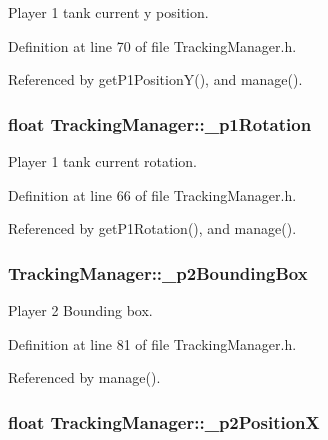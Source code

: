 Player 1 tank current y position. 



Definition at line 70 of file Tracking\-Manager.\-h.



Referenced by get\-P1\-Position\-Y(), and manage().

\hypertarget{classTrackingManager_a8c7de22662c27124fac80902d4f8ba41}{
\subsubsection[{\-\_\-p1\-Rotation}]{\setlength{\rightskip}{0pt plus 5cm}float Tracking\-Manager\-::\-\_\-p1\-Rotation\hspace{0.3cm}{\ttfamily [private]}}}\label{classTrackingManager_a8c7de22662c27124fac80902d4f8ba41}


Player 1 tank current rotation. 



Definition at line 66 of file Tracking\-Manager.\-h.



Referenced by get\-P1\-Rotation(), and manage().

\hypertarget{classTrackingManager_a345399f12e52bc4b23786fe73b26a6ff}{
\subsubsection[{\-\_\-p2\-Bounding\-Box}]{ Tracking\-Manager\-::\-\_\-p2\-Bounding\-Box\hspace{0.3cm}{\ttfamily [private]}}}\label{classTrackingManager_a345399f12e52bc4b23786fe73b26a6ff}


Player 2 Bounding box. 



Definition at line 81 of file Tracking\-Manager.\-h.



Referenced by manage().

\hypertarget{classTrackingManager_a0f3a043190aba11b137c52052dc2ed3a}{
\subsubsection[{\-\_\-p2\-Position\-X}]{\setlength{\rightskip}{0pt plus 5cm}float Tracking\-Manager\-::\-\_\-p2\-Position\-X\hspace{0.3cm}{\ttfamily [private]}}}\label{classTrackingManager_a0f3a043190aba11b137c52052dc2ed3a}


